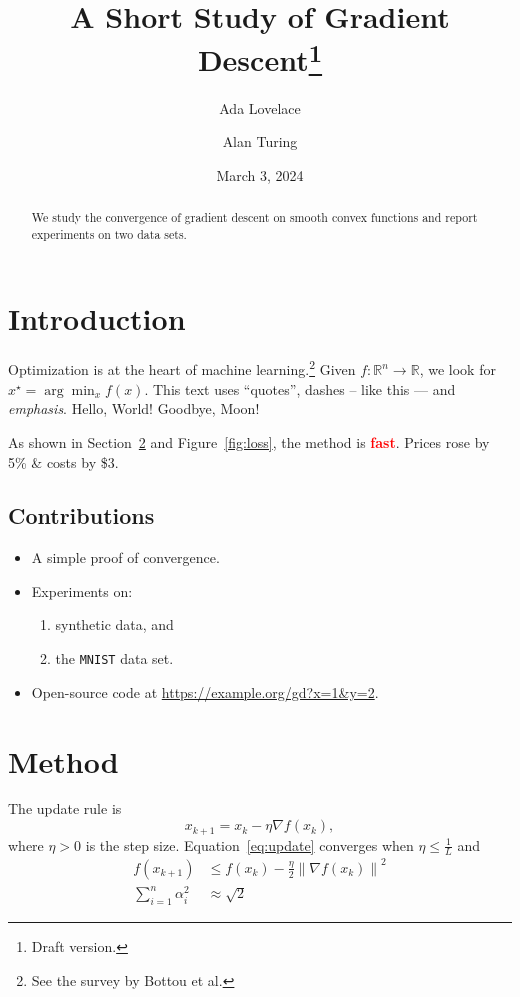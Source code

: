 \documentclass[11pt,a4paper]{article}
\title{A Short Study of Gradient Descent\thanks{Draft version.}}
\author{Ada Lovelace \and Alan Turing}
\date{March 3, 2024}
\newcommand{\R}{\mathbb{R}}
\newcommand{\norm}[1]{\left\lVert #1 \right\rVert}
\newcommand{\important}[1]{\textbf{\textcolor{red}{#1}}}
\newcommand{\greet}[2][Hello]{#1, #2!}
\begin{document}
\maketitle

\begin{abstract}
We study the convergence of gradient descent on smooth convex functions
and report experiments on two data sets.
\end{abstract}

\section{Introduction}\label{sec:intro}
Optimization is at the heart of machine learning.\footnote{See the survey by Bottou et al.}
Given $f\colon \R^n \to \R$, we look for $x^\star = \arg\min_x f(x)$.
This text uses ``quotes'', dashes -- like this --- and \emph{emphasis}.
\greet{World} \greet[Goodbye]{Moon}

As shown in Section~\ref{sec:method} and Figure~\ref{fig:loss}, the method is
\important{fast}. Prices rose by 5\% \& costs by \$3.

\subsection{Contributions}
\begin{itemize}
  \item A simple proof of convergence.
  \item Experiments on:
  \begin{enumerate}
    \item synthetic data, and
    \item the \texttt{MNIST} data set.
  \end{enumerate}
  \item Open-source code at \url{https://example.org/gd?x=1&y=2}.
\end{itemize}

\section{Method}\label{sec:method}
The update rule is
\begin{equation}\label{eq:update}
  x_{k+1} = x_k - \eta \nabla f(x_k),
\end{equation}
where $\eta > 0$ is the step size. Equation~\eqref{eq:update} converges when
$\eta \leq \frac{1}{L}$ and
\begin{align}
  f(x_{k+1}) &\leq f(x_k) - \frac{\eta}{2}\norm{\nabla f(x_k)}^2 \\
  \sum_{i=1}^{n} \alpha_i^2 &\approx \sqrt{2} \nonumber
\end{align}
\end{document}
